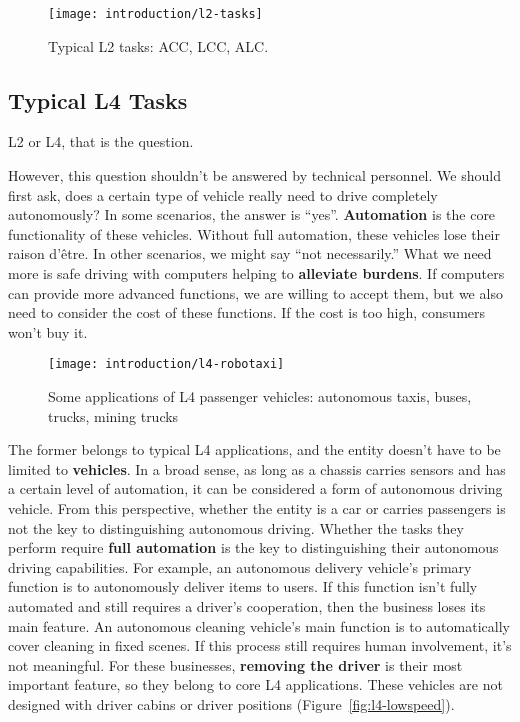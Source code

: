 \begin{figure}[!htp]
	\centering
	\texttt{[image: introduction/l2-tasks]}
	\caption{Typical L2 tasks: ACC, LCC, ALC. }
	\label{fig:l2-tasks}
\end{figure}

\subsection{Typical L4 Tasks}
L2 or L4, that is the question.

However, this question shouldn't be answered by technical personnel. We should first ask, does a certain type of vehicle really need to drive completely autonomously? In some scenarios, the answer is ``yes''. \textbf{Automation} is the core functionality of these vehicles. Without full automation, these vehicles lose their raison d'être. In other scenarios, we might say ``not necessarily.'' What we need more is safe driving with computers helping to \textbf{alleviate burdens}. If computers can provide more advanced functions, we are willing to accept them, but we also need to consider the cost of these functions. If the cost is too high, consumers won't buy it.

\begin{figure}[!t]
	\centering
	\texttt{[image: introduction/l4-robotaxi]}
	\caption{Some applications of L4 passenger vehicles: autonomous taxis, buses, trucks, mining trucks}
	\label{fig:l4-robotaxi}
\end{figure}

The former belongs to typical L4 applications, and the entity doesn't have to be limited to \textbf{vehicles}. In a broad sense, as long as a chassis carries sensors and has a certain level of automation, it can be considered a form of autonomous driving vehicle. From this perspective, whether the entity is a car or carries passengers is not the key to distinguishing autonomous driving. Whether the tasks they perform require \textbf{full automation} is the key to distinguishing their autonomous driving capabilities. For example, an autonomous delivery vehicle's primary function is to autonomously deliver items to users. If this function isn't fully automated and still requires a driver's cooperation, then the business loses its main feature. An autonomous cleaning vehicle's main function is to automatically cover cleaning in fixed scenes. If this process still requires human involvement, it's not meaningful. For these businesses, \textbf{removing the driver} is their most important feature, so they belong to core L4 applications. These vehicles are not designed with driver cabins or driver positions (Figure~\ref{fig:l4-lowspeed}).


